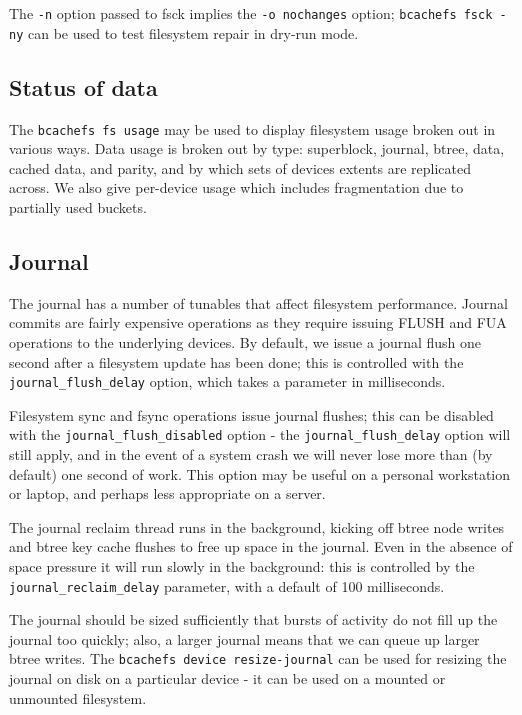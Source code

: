 \documentclass{article}
\begin{document}
The \texttt{-n} option passed to fsck implies the \texttt{-o nochanges} option;
\texttt{bcachefs fsck -ny} can be used to test filesystem repair in dry-run
mode.

\subsection{Status of data}

The \texttt{bcachefs fs usage} may be used to display filesystem usage broken
out in various ways. Data usage is broken out by type: superblock, journal,
btree, data, cached data, and parity, and by which sets of devices extents are
replicated across. We also give per-device usage which includes fragmentation
due to partially used buckets.

\subsection{Journal}

The journal has a number of tunables that affect filesystem performance. Journal
commits are fairly expensive operations as they require issuing FLUSH and FUA
operations to the underlying devices. By default, we issue a journal flush one
second after a filesystem update has been done; this is controlled with the
\texttt{journal\_flush\_delay} option, which takes a parameter in milliseconds.

Filesystem sync and fsync operations issue journal flushes; this can be disabled
with the \texttt{journal\_flush\_disabled} option - the
\texttt{journal\_flush\_delay} option will still apply, and in the event of a
system crash we will never lose more than (by default) one second of work. This
option may be useful on a personal workstation or laptop, and perhaps less
appropriate on a server.

The journal reclaim thread runs in the background, kicking off btree node writes
and btree key cache flushes to free up space in the journal. Even in the absence
of space pressure it will run slowly in the background: this is controlled by
the \texttt{journal\_reclaim\_delay} parameter, with a default of 100
milliseconds.

The journal should be sized sufficiently that bursts of activity do not fill up
the journal too quickly; also, a larger journal means that we can queue up
larger btree writes. The \texttt{bcachefs device resize-journal} can be used for
resizing the journal on disk on a particular device - it can be used on a
mounted or unmounted filesystem.
\end{document}
